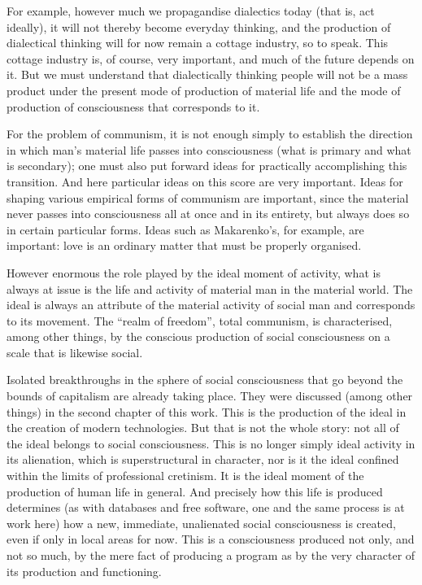\documentclass[../main]{subfiles}
\begin{document}
For example, however much we propagandise dialectics today (that is, act ideally), it will not thereby become everyday thinking, and the production of dialectical thinking will for now remain a cottage industry, so to speak. This cottage industry is, of course, very important, and much of the future depends on it. But we must understand that dialectically thinking people will not be a mass product under the present mode of production of material life and the mode of production of consciousness that corresponds to it.

For the problem of communism, it is not enough simply to establish the direction in which man’s material life passes into consciousness (what is primary and what is secondary); one must also put forward ideas for practically accomplishing this transition. And here particular ideas on this score are very important. Ideas for shaping various empirical forms of communism are important, since the material never passes into consciousness all at once and in its entirety, but always does so in certain particular forms. Ideas such as Makarenko’s, for example, are important: love is an ordinary matter that must be properly organised.

However enormous the role played by the ideal moment of activity, what is always at issue is the life and activity of material man in the material world. The ideal is always an attribute of the material activity of social man and corresponds to its movement. The “realm of freedom”, total communism, is characterised, among other things, by the conscious production of social consciousness on a scale that is likewise social.

Isolated breakthroughs in the sphere of social consciousness that go beyond the bounds of capitalism are already taking place. They were discussed (among other things) in the second chapter of this work. This is the production of the ideal in the creation of modern technologies. But that is not the whole story: not all of the ideal belongs to social consciousness. This is no longer simply ideal activity in its alienation, which is superstructural in character, nor is it the ideal confined within the limits of professional cretinism. It is the ideal moment of the production of human life in general. And precisely how this life is produced determines (as with databases and free software, one and the same process is at work here) how a new, immediate, unalienated social consciousness is created, even if only in local areas for now. This is a consciousness produced not only, and not so much, by the mere fact of producing a program as by the very character of its production and functioning.
\end{document}
